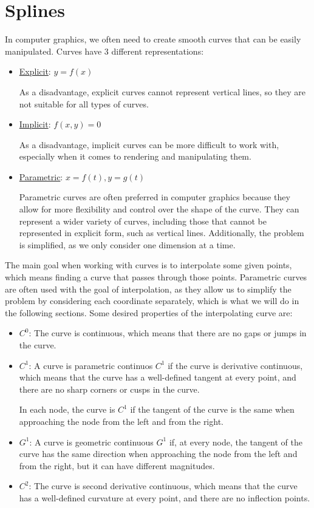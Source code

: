 \chapter{Splines}

In computer graphics, we often need to create smooth curves that can be easily manipulated. Curves have 3 different representations:
\begin{itemize}
    \item \ul{Explicit}: $y = f(x)$
    
    As a disadvantage, explicit curves cannot represent vertical lines, so they are not suitable for all types of curves.
    \item \ul{Implicit}: $f(x,y) = 0$
    
    As a disadvantage, implicit curves can be more difficult to work with, especially when it comes to rendering and manipulating them.
    \item \ul{Parametric}: $x = f(t), y = g(t)$
    
    Parametric curves are often preferred in computer graphics because they allow for more flexibility and control over the shape of the curve. They can represent a wider variety of curves, including those that cannot be represented in explicit form, such as vertical lines. Additionally, the problem is simplified, as we only consider one dimension at a time.
\end{itemize}

The main goal when working with curves is to interpolate some given points, which means finding a curve that passes through those points. Parametric curves are often used with the goal of interpolation, as they allow us to simplify the problem by considering each coordinate separately, which is what we will do in the following sections. Some desired properties of the interpolating curve are:
\begin{itemize}
    \item \ul{$C^0$}: The curve is continuous, which means that there are no gaps or jumps in the curve.
    \item \ul{$C^1$}: A curve is parametric continuos $C^1$ if the curve is derivative continuous, which means that the curve has a well-defined tangent at every point, and there are no sharp corners or cusps in the curve.
    
    In each node, the curve is $C^1$ if the tangent of the curve is the same when approaching the node from the left and from the right.
    
    \item \ul{$G^1$}: A curve is geometric continuous $G^1$ if, at every node, the tangent of the curve has the same direction when approaching the node from the left and from the right, but it can have different magnitudes.
    \item \ul{$C^2$}: The curve is second derivative continuous, which means that the curve has a well-defined curvature at every point, and there are no inflection points.
\end{itemize}

